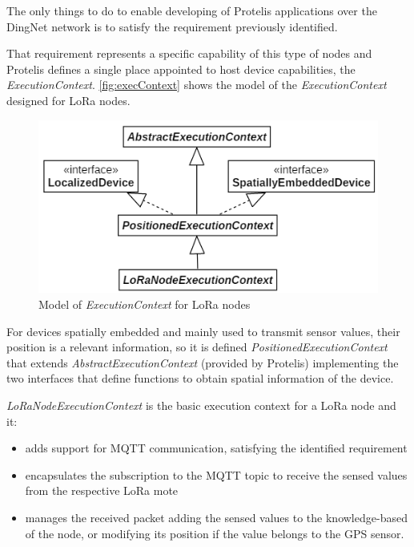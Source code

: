 The only things to do to enable developing of Protelis applications over the DingNet network is to satisfy the requirement previously identified.

That requirement represents a specific capability of this type of nodes and Protelis defines a single place appointed to host device capabilities, the \mbox{\textit{ExecutionContext}}.
\autoref{fig:execContext} shows the model of the \mbox{\textit{ExecutionContext}} designed for LoRa nodes. 
\begin{figure}[H]
    \centering
    \includegraphics{figures/execContext.png}
    \caption{Model of \textit{ExecutionContext} for LoRa nodes}
    \label{fig:execContext}
\end{figure}
\noindent For devices spatially embedded and mainly used to transmit sensor values, their position is a relevant information, so it is defined \mbox{\textit{PositionedExecutionContext}} that extends \mbox{\textit{AbstractExecutionContext}} (provided by Protelis) implementing the two interfaces that define functions to obtain spatial information of the device.

\mbox{\textit{LoRaNodeExecutionContext}} is the basic execution context for a LoRa node and it:
% 
\begin{itemize}
    \item adds support for MQTT communication, satisfying the identified requirement
    \item encapsulates the subscription to the MQTT topic to receive the sensed values from the respective LoRa mote
    \item manages the received packet adding the sensed values to the knowledge-based of the node, or modifying its position if the value belongs to the GPS sensor.
\end{itemize}
